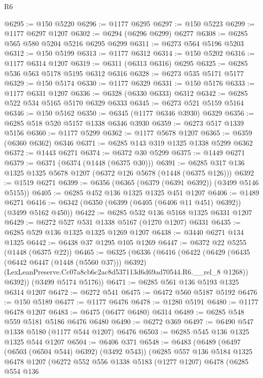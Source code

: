 \begin{lexlean}{R6}
\begin{coremodule}
@6295 := @150 @5220
@6296 := @1177 @6295
@6297 := @150 @5223
@6299 := @1177 @6297 @1207
@6302 := @6294 (@6296 @6299) @6277
@6308 := @6285 @565 @580 @5204 @5216 @6295 @6299
@6311 := @6273 @564 @5196 @5203
@6312 := @150 @5199
@6313 := @1177 @6312
@6314 := @150 @5202
@6316 := @1177 @6314 @1207
@6319 := @6311 (@6313 @6316) @6295
@6325 := @6285 @536 @563 @5178 @5195 @6312 @6316
@6328 := @6273 @535 @5171 @5177
@6329 := @150 @5174
@6330 := @1177 @6329
@6331 := @150 @5176
@6333 := @1177 @6331 @1207
@6336 := @6328 (@6330 @6333) @6312
@6342 := @6285 @522 @534 @5165 @5170 @6329 @6333
@6345 := @6273 @521 @5159 @5164
@6346 := @150 @5162
@6350 := @6345 (@1177 @6346 @3930) @6329
@6356 := @6285 @518 @520 @5157 @1338 @6346 @3930
@6359 := @6273 @517 @1339 @5156
@6360 := @1177 @5299
@6362 := @1177 @5678 @1207
@6365 := @6359 (@6360 @6362) @6346
@6371 := @6285 @143 @319 @1325 @1338 @5299 @6362
@6372 := @1443 @6271
@6374 := @6372 @30 @5299
@6375 := @1449 @6271
@6379 := @6371 (@6374 (@1448 (@6375 @30)))
@6391 := @6285 @317 @136 @1325 @1325 @5678 @1207 (@6372 @126 @5678 (@1448 (@6375 @126)))
@6392 := @1519 @6271
@6399 := @6356 (@6365 (@6379 (@6391 @6392)) (@3499 @5146 @5155))
@6405 := @6285 @452 @136 @1325 @1325 @451 @1207
@6406 := @1489 @6271
@6416 := @6342 (@6350 (@6399 (@6405 (@6406 @11 @451) @6392)) (@3499 @5162 @450))
@6422 := @6285 @532 @136 @5168 @1325 @6331 @1207
@6429 := @6272 @527 @531 @1338 @5167 (@1270 @1207) @6331
@6435 := @6285 @529 @136 @1325 @1325 @1269 @1207
@6438 := @3440 @6271 @134 @1325
@6442 := @6438 @37 @1295 @105 @1269
@6447 := @6372 @22 @5255 (@1448 (@6375 @22))
@6465 := @6325
    (@6336
      (@6416
        (@6422
          (@6429
            (@6435 (@6442 @6447 (@1448 (@5560 @37))) @6392)
            (LexLeanPreserve.Cc07a8cb6c2ac8d537113d6d69ad70544.R6.__rel_8 @1268))
          @6392))
      (@3499 @5174 @5176))
@6471 := @6285 @561 @136 @5193 @1325 @6314 @1207
@6472 := @6272 @541
@6475 := @6472 @560 @5187 @5192
@6476 := @150 @5189
@6477 := @1177 @6476
@6478 := @1280 @5191
@6480 := @1177 @6478 @1207
@6483 := @6475 (@6477 @6480) @6314
@6489 := @6285 @548 @559 @5181 @5186 @6476 @6480
@6490 := @6272 @369
@6497 := @6490 @547 @1338 @5180 (@1177 @544 @1207) @6476
@6503 := @6285 @545 @136 @1325 @1325 @544 @1207
@6504 := @6406 @371
@6548 := @6483
    (@6489
      (@6497 (@6503 (@6504 @544) @6392) (@3492 @543))
      (@6285
        @557
        @136
        @5184
        @1325
        @6478
        @1207
        (@6272
          @552
          @556
          @1338
          @5183
          (@1277 @1207)
          @6478
          (@6285
            @554
            @136

\end{coremodule}
\end{lexlean}
